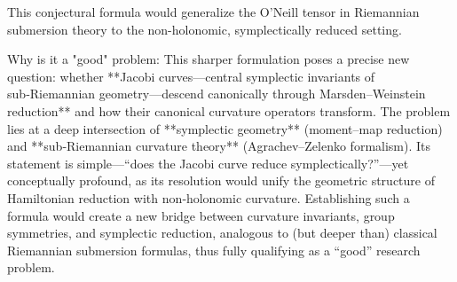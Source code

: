 This conjectural formula would generalize the O’Neill tensor in Riemannian submersion theory to the non-holonomic, symplectically reduced setting.

Why is it a "good" problem:  
This sharper formulation poses a precise new question: whether **Jacobi curves—central symplectic invariants of sub‑Riemannian geometry—descend canonically through Marsden–Weinstein reduction** and how their canonical curvature operators transform. The problem lies at a deep intersection of **symplectic geometry** (moment–map reduction) and **sub‑Riemannian curvature theory** (Agrachev–Zelenko formalism). Its statement is simple—“does the Jacobi curve reduce symplectically?”—yet conceptually profound, as its resolution would unify the geometric structure of Hamiltonian reduction with non‑holonomic curvature. Establishing such a formula would create a new bridge between curvature invariants, group symmetries, and symplectic reduction, analogous to (but deeper than) classical Riemannian submersion formulas, thus fully qualifying as a “good” research problem.